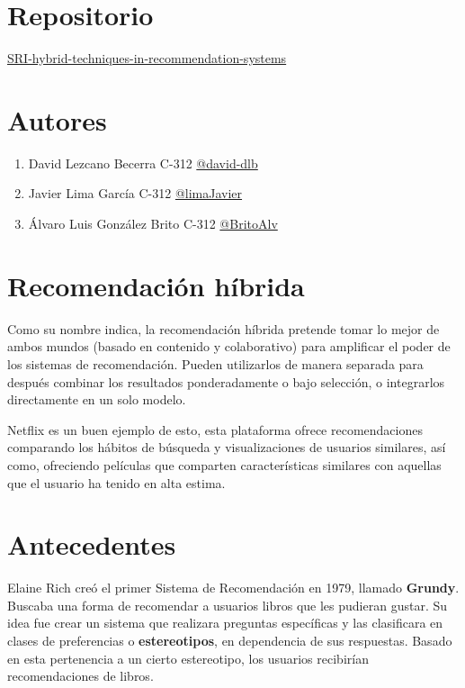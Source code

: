 \documentclass[14pt]{extarticle}
\begin{document}
\section{Repositorio}

\href{https://github.com/BritoAlv/SRI-hybrid-techniques-in-recommendation-systems}{SRI-hybrid-techniques-in-recommendation-systems}


\section{Autores}
\begin{enumerate}
    \item David Lezcano Becerra C-312 \href{https://github.com/david-dlb}{@david-dlb}
    \item Javier Lima García C-312 \href{https://github.com/limaJavier}{@limaJavier}
    \item Álvaro Luis González Brito C-312 \href{https://github.com/BritoAlv}{@BritoAlv}
\end{enumerate}


\section{Recomendación híbrida}

Como su nombre indica, la recomendación híbrida pretende tomar lo mejor de ambos mundos (basado en contenido y colaborativo) para amplificar el poder de los sistemas de recomendación. Pueden utilizarlos de manera separada para después combinar los resultados ponderadamente o bajo selección, o integrarlos directamente en un solo modelo.

Netflix es un buen ejemplo de esto, esta plataforma ofrece recomendaciones comparando los hábitos de búsqueda y visualizaciones de usuarios similares, así como, ofreciendo películas que comparten características similares con aquellas que el usuario ha tenido en alta estima.

\section{Antecedentes}

Elaine Rich creó el primer Sistema de Recomendación en 1979, llamado \textbf{Grundy}. Buscaba una forma de recomendar a usuarios libros que les pudieran gustar. Su idea fue crear un sistema que realizara preguntas específicas y las clasificara en clases de preferencias o \textbf{estereotipos}, en dependencia de sus respuestas. Basado en esta pertenencia a un cierto estereotipo, los usuarios recibirían recomendaciones de libros.
\end{document}
